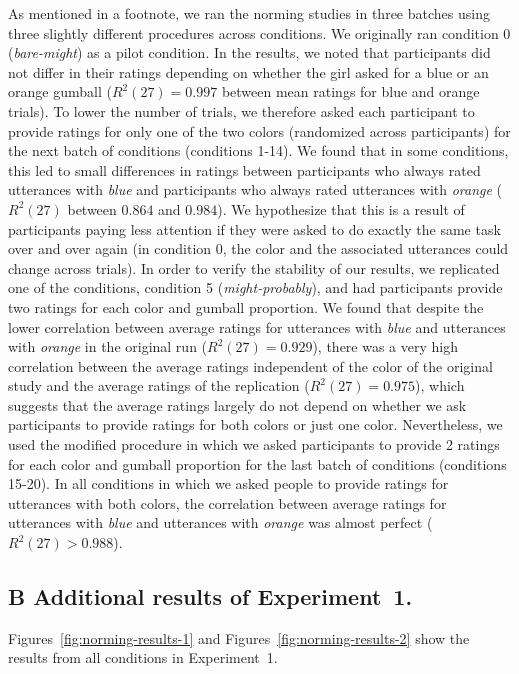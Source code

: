 \documentclass[man, floatsintext]{apa6}
\begin{document}
As mentioned in a footnote, we ran the norming studies in three batches using three slightly different procedures across conditions. We originally ran condition 0 (\emph{bare-might}) as a pilot condition. In the results, we noted that participants did not differ in their ratings depending on whether the girl asked for a blue or an orange gumball ($R^2(27)=0.997$ between mean ratings for blue and orange trials). To lower the number of trials, we therefore asked each participant to provide ratings for only one of the two colors (randomized across participants) for the next batch of conditions (conditions 1-14). We found that in some conditions, this led to small differences in ratings between participants who always rated utterances with \emph{blue} and participants who always rated utterances with \textit{orange} ($R^2(27)$ between $0.864$ and $0.984$). We hypothesize that this is a result of participants paying less attention if they were asked to do exactly the same task over and over again (in condition 0, the color and the associated utterances could change across trials). In order to verify the stability of our results, we replicated one of the conditions, condition 5 (\emph{might-probably}), and had participants provide two ratings for each color and gumball proportion. We found that despite the lower correlation between average ratings for utterances with \emph{blue} and utterances with \emph{orange} in the original run ($R^2(27)=0.929$), there was a very high correlation between the average ratings independent of the color of the original study and the average ratings of the replication ($R^2(27)=0.975$), which suggests that the average ratings largely do not depend on whether we ask participants to provide ratings for both colors or just one color. Nevertheless, we used the modified procedure in which we asked participants to provide 2 ratings for each color and gumball proportion for the last batch of conditions (conditions 15-20). In all conditions in which we asked people to provide ratings for utterances with both colors, the correlation between average ratings for utterances with \emph{blue} and utterances with \emph{orange} was almost perfect ($R^2(27)>0.988$).


\pagebreak
\FloatBarrier


\subsection*{B Additional results of Experiment~1.}

Figures~\ref{fig:norming-results-1} and Figures~\ref{fig:norming-results-2} show the results from all conditions in Experiment~1. 
\end{document}
